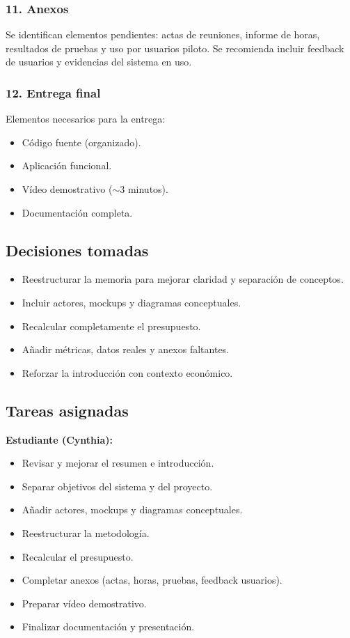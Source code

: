 \subsubsection*{11. Anexos}
Se identifican elementos pendientes: actas de reuniones, informe de horas, resultados de pruebas y uso por usuarios piloto. Se recomienda incluir feedback de usuarios y evidencias del sistema en uso.

\subsubsection*{12. Entrega final}
Elementos necesarios para la entrega:
\begin{itemize}
    \item Código fuente (organizado).
    \item Aplicación funcional.
    \item Vídeo demostrativo ($\sim$3 minutos).
    \item Documentación completa.
\end{itemize}

\subsection*{Decisiones tomadas}
\begin{itemize}
    \item Reestructurar la memoria para mejorar claridad y separación de conceptos.
    \item Incluir actores, mockups y diagramas conceptuales.
    \item Recalcular completamente el presupuesto.
    \item Añadir métricas, datos reales y anexos faltantes.
    \item Reforzar la introducción con contexto económico.
\end{itemize}

\subsection*{Tareas asignadas}

\textbf{Estudiante (Cynthia):}
\begin{itemize}
    \item Revisar y mejorar el resumen e introducción.
    \item Separar objetivos del sistema y del proyecto.
    \item Añadir actores, mockups y diagramas conceptuales.
    \item Reestructurar la metodología.
    \item Recalcular el presupuesto.
    \item Completar anexos (actas, horas, pruebas, feedback usuarios).
    \item Preparar vídeo demostrativo.
    \item Finalizar documentación y presentación.
\end{itemize}


